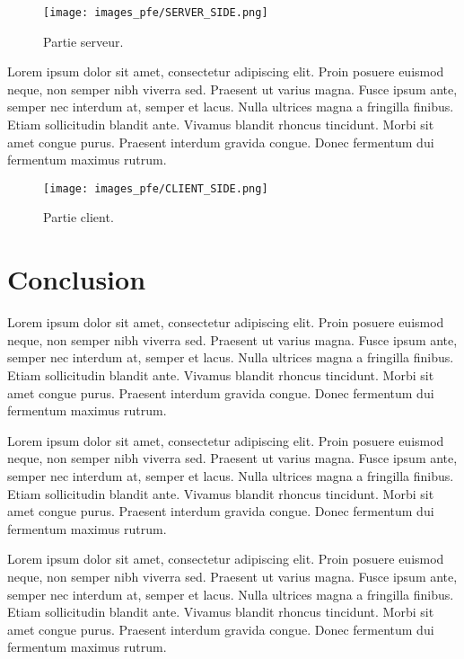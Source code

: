 \begin{figure}[hbt!]
  \centering
  \texttt{[image: images\_pfe/SERVER\_SIDE.png]}
  \caption{Partie serveur.}
  \label{fig:server-side}
\end{figure}
\FloatBarrier

\medskip

Lorem ipsum dolor sit amet, consectetur adipiscing elit. Proin posuere euismod neque, non semper nibh viverra sed. Praesent ut varius magna. Fusce ipsum ante, semper nec interdum at, semper et lacus. Nulla ultrices magna a fringilla finibus. Etiam sollicitudin blandit ante. Vivamus blandit rhoncus tincidunt. Morbi sit amet congue purus. Praesent interdum gravida congue. Donec fermentum dui fermentum maximus rutrum.


\begin{figure}[hbt!]
  \centering
  \texttt{[image: images\_pfe/CLIENT\_SIDE.png]}
  \caption{Partie client.}
  \label{fig:client-side}
\end{figure}
\FloatBarrier



\section{Conclusion}
Lorem ipsum dolor sit amet, consectetur adipiscing elit. Proin posuere euismod neque, non semper nibh viverra sed. Praesent ut varius magna. Fusce ipsum ante, semper nec interdum at, semper et lacus. Nulla ultrices magna a fringilla finibus. Etiam sollicitudin blandit ante. Vivamus blandit rhoncus tincidunt. Morbi sit amet congue purus. Praesent interdum gravida congue. Donec fermentum dui fermentum maximus rutrum.

Lorem ipsum dolor sit amet, consectetur adipiscing elit. Proin posuere euismod neque, non semper nibh viverra sed. Praesent ut varius magna. Fusce ipsum ante, semper nec interdum at, semper et lacus. Nulla ultrices magna a fringilla finibus. Etiam sollicitudin blandit ante. Vivamus blandit rhoncus tincidunt. Morbi sit amet congue purus. Praesent interdum gravida congue. Donec fermentum dui fermentum maximus rutrum.

Lorem ipsum dolor sit amet, consectetur adipiscing elit. Proin posuere euismod neque, non semper nibh viverra sed. Praesent ut varius magna. Fusce ipsum ante, semper nec interdum at, semper et lacus. Nulla ultrices magna a fringilla finibus. Etiam sollicitudin blandit ante. Vivamus blandit rhoncus tincidunt. Morbi sit amet congue purus. Praesent interdum gravida congue. Donec fermentum dui fermentum maximus rutrum.

